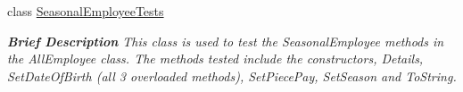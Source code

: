 \begin{DoxyCompactItemize}
class \hyperlink{class_my_all_employee_1_1_tests_1_1_seasonal_employee_tests}{Seasonal\+Employee\+Tests}
\begin{DoxyCompactList}\small\item\em {\bfseries  Brief Description} This class is used to test the Seasonal\+Employee methods in the All\+Employee class. The methods tested include the constructors, Details, Set\+Date\+Of\+Birth (all 3 overloaded methods), Set\+Piece\+Pay, Set\+Season and To\+String. \end{DoxyCompactList}\end{DoxyCompactItemize}
